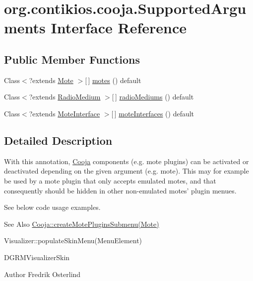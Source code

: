 \hypertarget{interfaceorg_1_1contikios_1_1cooja_1_1SupportedArguments}{\section{org.\-contikios.\-cooja.\-Supported\-Arguments Interface Reference}
\label{interfaceorg_1_1contikios_1_1cooja_1_1SupportedArguments}
}
\subsection*{Public Member Functions}
\begin{DoxyCompactItemize}
\item 
Class$<$?extends \hyperlink{interfaceorg_1_1contikios_1_1cooja_1_1Mote}{Mote} $>$\mbox{[}$\,$\mbox{]} \hyperlink{interfaceorg_1_1contikios_1_1cooja_1_1SupportedArguments_a59f2db1fa7c770594a08404cf503c155}{motes} () default
\item 
Class$<$?extends \hyperlink{classorg_1_1contikios_1_1cooja_1_1RadioMedium}{Radio\-Medium} $>$\mbox{[}$\,$\mbox{]} \hyperlink{interfaceorg_1_1contikios_1_1cooja_1_1SupportedArguments_a68a7483b2974e2c527ebf82593789764}{radio\-Mediums} () default
\item 
Class$<$?extends \hyperlink{classorg_1_1contikios_1_1cooja_1_1MoteInterface}{Mote\-Interface} $>$\mbox{[}$\,$\mbox{]} \hyperlink{interfaceorg_1_1contikios_1_1cooja_1_1SupportedArguments_a59c91543d5d98c7f21ff8a781e146743}{mote\-Interfaces} () default
\end{DoxyCompactItemize}


\subsection{Detailed Description}
With this annotation, \hyperlink{classorg_1_1contikios_1_1cooja_1_1Cooja}{Cooja} components (e.\-g. mote plugins) can be activated or deactivated depending on the given argument (e.\-g. mote). This may for example be used by a mote plugin that only accepts emulated motes, and that consequently should be hidden in other non-\/emulated motes' plugin menues.

See below code usage examples.

\begin{DoxySeeAlso}{See Also}
\hyperlink{classorg_1_1contikios_1_1cooja_1_1Cooja_a05c932e736bae89b68e5fc74fd6c6648}{Cooja\-::create\-Mote\-Plugins\-Submenu(\-Mote)} 

Visualizer\-::populate\-Skin\-Menu(\-Menu\-Element) 

D\-G\-R\-M\-Visualizer\-Skin
\end{DoxySeeAlso}
\begin{DoxyAuthor}{Author}
Fredrik Osterlind 
\end{DoxyAuthor}


